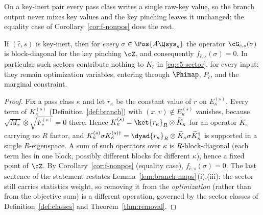 
On a key-inert pair every pass class writes a single raw-key value, so the
branch output never mixes key values and the key pinching leaves it
unchanged; the equality case of Corollary~\ref{cor:f-nonpos} does the rest.

\begin{proposition}\label{prop:exact-cancellation}
If $(\hat c,s)$ is key-inert, then for \emph{every}
$\sigma\in\Pos{A\Qsys_s}$ the operator $\cG_{\hat c,s}(\sigma)$ is
block-diagonal for the key pinching $\cZ$, and consequently
$f_{\hat c,s}(\sigma)=0$. In particular such sectors contribute nothing to
$K_{\hat c}$ in \eqref{eq:c5-sector}, for every input; they remain
optimization variables, entering through $\Phimap$, $P_{\hat c}$, and the
marginal constraint.
\end{proposition}

\begin{proof}
Fix a pass class $\kappa$ and let $r_{\kappa}$ be the constant value of $r$
on $E^{(s)}_{\kappa}$. Every term of $K^{(s)}_{\kappa}$
(Definition~\ref{def:branch}) with $(x,v)\notin E^{(s)}_{\kappa}$ vanishes,
because $\sqrt{M_x}\otimes\sqrt{F^{(s)}_v}=0$ there. Hence
$K^{(s)}_{\kappa}=\ket{r_{\kappa}}_{R}\otimes\widetilde K_{\kappa}$ for an
operator $\widetilde K_{\kappa}$ carrying no $R$ factor, and
$K^{(s)}_{\kappa}\sigma K^{(s)\dagger}_{\kappa}
=\dyad{r_{\kappa}}_{R}\otimes
\widetilde K_{\kappa}\sigma\widetilde K_{\kappa}^{\dagger}$ is supported in
a single $R$-eigenspace. A sum of such operators over
$\kappa$ is $R$-block-diagonal (each term lies in one block, possibly
different blocks for different $\kappa$), hence a fixed point of $\cZ$.
By Corollary~\ref{cor:f-nonpos} (equality case), $f_{\hat c,s}(\sigma)=0$.
The last sentence of the statement restates
Lemma~\ref{lem:branch-maps}\,(i),(iii): the sector still carries statistics
weight, so removing it from the \emph{optimization} (rather than from the
objective sum) is a different operation, governed by the sector classes of
Definition~\ref{def:classes} and Theorem~\ref{thm:removal}.
\end{proof}
